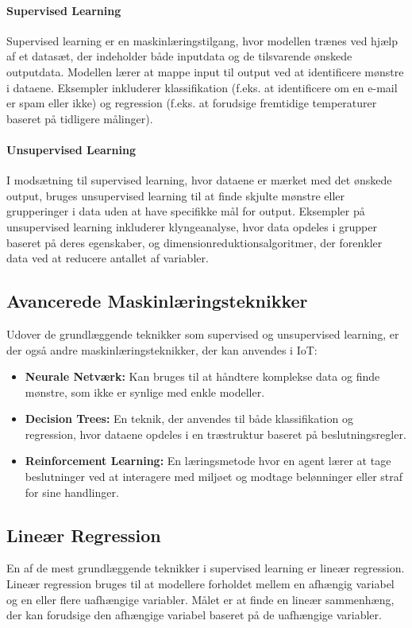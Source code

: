 \documentclass[12pt,a4paper]{book}
\begin{document}
	\paragraph{Supervised Learning}
	Supervised learning er en maskinlæringstilgang, hvor modellen trænes ved hjælp af et datasæt, der indeholder både inputdata og de tilsvarende ønskede outputdata. Modellen lærer at mappe input til output ved at identificere mønstre i dataene. Eksempler inkluderer klassifikation (f.eks. at identificere om en e-mail er spam eller ikke) og regression (f.eks. at forudsige fremtidige temperaturer baseret på tidligere målinger).
	
	\paragraph{Unsupervised Learning}
	I modsætning til supervised learning, hvor dataene er mærket med det ønskede output, bruges unsupervised learning til at finde skjulte mønstre eller grupperinger i data uden at have specifikke mål for output. Eksempler på unsupervised learning inkluderer klyngeanalyse, hvor data opdeles i grupper baseret på deres egenskaber, og dimensionreduktionsalgoritmer, der forenkler data ved at reducere antallet af variabler.
	
	\subsection{Avancerede Maskinlæringsteknikker}
	Udover de grundlæggende teknikker som supervised og unsupervised learning, er der også andre maskinlæringsteknikker, der kan anvendes i IoT:
	\begin{itemize}
		\item \textbf{Neurale Netværk:} Kan bruges til at håndtere komplekse data og finde mønstre, som ikke er synlige med enkle modeller.
		\item \textbf{Decision Trees:} En teknik, der anvendes til både klassifikation og regression, hvor dataene opdeles i en træstruktur baseret på beslutningsregler.
		\item \textbf{Reinforcement Learning:} En læringsmetode hvor en agent lærer at tage beslutninger ved at interagere med miljøet og modtage belønninger eller straf for sine handlinger.
	\end{itemize}
	
	\subsection{Lineær Regression}
	En af de mest grundlæggende teknikker i supervised learning er lineær regression. Lineær regression bruges til at modellere forholdet mellem en afhængig variabel og en eller flere uafhængige variabler. Målet er at finde en lineær sammenhæng, der kan forudsige den afhængige variabel baseret på de uafhængige variabler.
	
\end{document}
